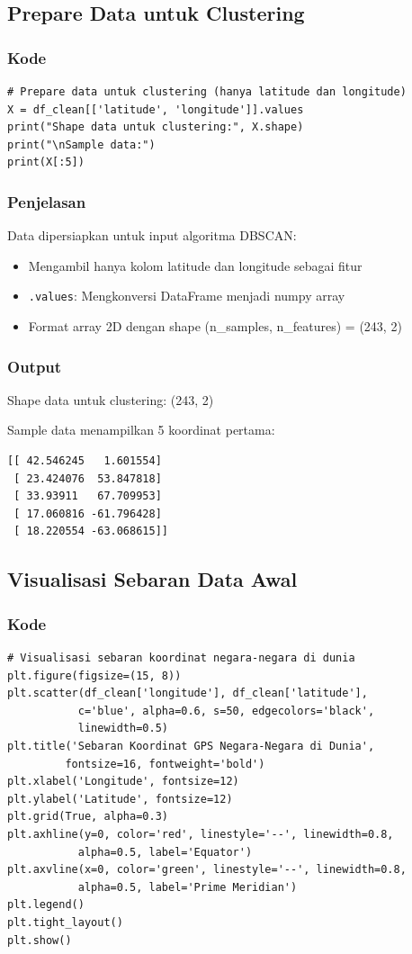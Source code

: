\documentclass[12pt,a4paper]{article}
\begin{document}
\subsection{Prepare Data untuk Clustering}

\subsubsection{Kode}
\begin{lstlisting}[style=pythonstyle]
# Prepare data untuk clustering (hanya latitude dan longitude)
X = df_clean[['latitude', 'longitude']].values
print("Shape data untuk clustering:", X.shape)
print("\nSample data:")
print(X[:5])
\end{lstlisting}

\subsubsection{Penjelasan}
Data dipersiapkan untuk input algoritma DBSCAN:
\begin{itemize}
    \item Mengambil hanya kolom latitude dan longitude sebagai fitur
    \item \texttt{.values}: Mengkonversi DataFrame menjadi numpy array
    \item Format array 2D dengan shape (n\_samples, n\_features) = (243, 2)
\end{itemize}

\subsubsection{Output}
Shape data untuk clustering: (243, 2)

Sample data menampilkan 5 koordinat pertama:
\begin{verbatim}
[[ 42.546245   1.601554]
 [ 23.424076  53.847818]
 [ 33.93911   67.709953]
 [ 17.060816 -61.796428]
 [ 18.220554 -63.068615]]
\end{verbatim}

\subsection{Visualisasi Sebaran Data Awal}

\subsubsection{Kode}
\begin{lstlisting}[style=pythonstyle]
# Visualisasi sebaran koordinat negara-negara di dunia
plt.figure(figsize=(15, 8))
plt.scatter(df_clean['longitude'], df_clean['latitude'], 
           c='blue', alpha=0.6, s=50, edgecolors='black', 
           linewidth=0.5)
plt.title('Sebaran Koordinat GPS Negara-Negara di Dunia', 
         fontsize=16, fontweight='bold')
plt.xlabel('Longitude', fontsize=12)
plt.ylabel('Latitude', fontsize=12)
plt.grid(True, alpha=0.3)
plt.axhline(y=0, color='red', linestyle='--', linewidth=0.8, 
           alpha=0.5, label='Equator')
plt.axvline(x=0, color='green', linestyle='--', linewidth=0.8, 
           alpha=0.5, label='Prime Meridian')
plt.legend()
plt.tight_layout()
plt.show()
\end{lstlisting}
\end{document}
